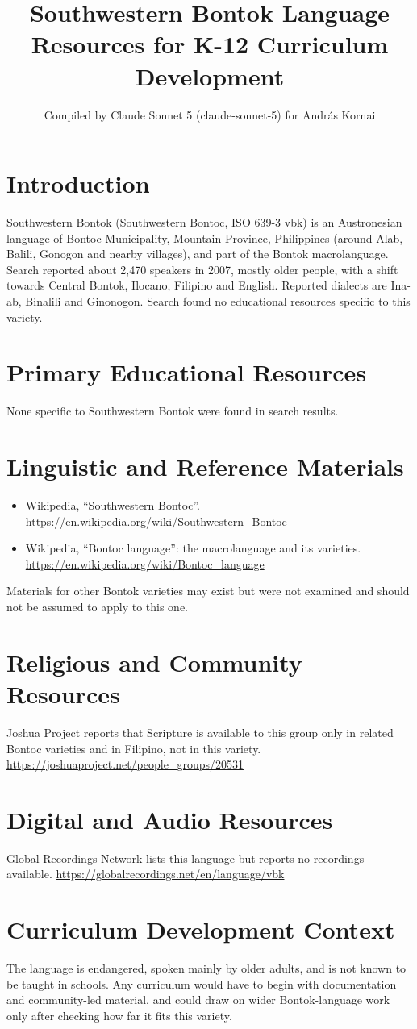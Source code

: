 \documentclass[12pt]{article}
\title{Southwestern Bontok Language Resources for K-12 Curriculum Development}
\author{Compiled by Claude Sonnet 5 (claude-sonnet-5) for Andr\'as Kornai}
\date{}
\begin{document}
\maketitle

\section{Introduction}
Southwestern Bontok (Southwestern Bontoc, ISO 639-3 vbk) is an Austronesian language of Bontoc Municipality, Mountain Province, Philippines (around Alab, Balili, Gonogon and nearby villages), and part of the Bontok macrolanguage. Search reported about 2,470 speakers in 2007, mostly older people, with a shift towards Central Bontok, Ilocano, Filipino and English. Reported dialects are Ina-ab, Binalili and Ginonogon. Search found no educational resources specific to this variety.

\section{Primary Educational Resources}
None specific to Southwestern Bontok were found in search results.

\section{Linguistic and Reference Materials}
\begin{itemize}
\item Wikipedia, ``Southwestern Bontoc''. \url{https://en.wikipedia.org/wiki/Southwestern_Bontoc}
\item Wikipedia, ``Bontoc language'': the macrolanguage and its varieties. \url{https://en.wikipedia.org/wiki/Bontoc_language}
\end{itemize}
Materials for other Bontok varieties may exist but were not examined and should not be assumed to apply to this one.

\section{Religious and Community Resources}
Joshua Project reports that Scripture is available to this group only in related Bontoc varieties and in Filipino, not in this variety. \url{https://joshuaproject.net/people_groups/20531}

\section{Digital and Audio Resources}
Global Recordings Network lists this language but reports no recordings available. \url{https://globalrecordings.net/en/language/vbk}

\section{Curriculum Development Context}
The language is endangered, spoken mainly by older adults, and is not known to be taught in schools. Any curriculum would have to begin with documentation and community-led material, and could draw on wider Bontok-language work only after checking how far it fits this variety.
\end{document}

